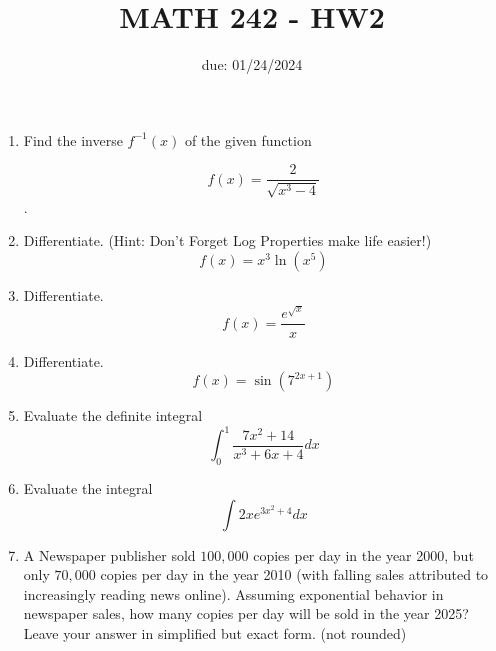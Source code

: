 \documentclass[12pt]{article}
\title{MATH 242 - HW2}
\date{due: 01/24/2024}
\begin{document}
\maketitle


\begin{enumerate}

\item Find the inverse $f^{-1}(x)$ of the given function

$$f(x)=\frac{2}{\sqrt{x^3-4}}$$.
\vfill

\item Differentiate. (Hint: Don't Forget Log Properties make life easier!) $$f(x)=x^3\ln{(x^5)}$$
\vfill




\newpage


\item Differentiate. $$f(x)=\frac{e^{\sqrt{x}}}{x}$$
\vfill


\item Differentiate. $$f(x)=\sin(7^{2x+1})$$
\vfill

\newpage

\item Evaluate the definite integral  $$\int_{0}^{1}\frac{7x^2+14}{x^3+6x+4}dx$$
\vfill

\item Evaluate the integral  $$\int 2xe^{3x^2+4}dx$$
\vfill
\newpage
\item A Newspaper publisher sold $100,000$ copies per day in the year 2000, but only $70,000$ copies per day in the year 2010 (with falling sales attributed to increasingly reading news online). Assuming exponential behavior in newspaper sales, how many copies per day will be sold in the year 2025? Leave your answer in simplified but exact form. (not rounded)

\end{enumerate}
\end{document}
